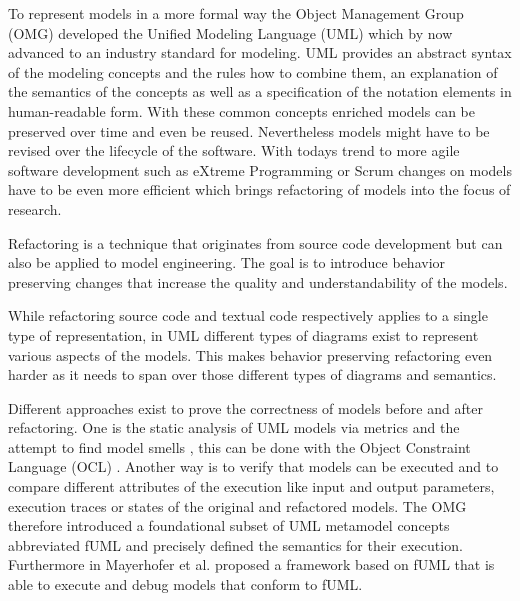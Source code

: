 \documentclass{llncs}
\begin{document}

To represent models in a more formal way the Object Management Group (OMG) developed the Unified Modeling Language (UML) 
\cite{man:UML} which by now advanced to an industry standard for 
modeling. UML provides an abstract syntax of the modeling concepts and the rules how to combine them, an explanation 
of the semantics of the concepts as well as a specification of the notation elements in human-readable form.
With these common concepts enriched models can be preserved over time and even be reused. Nevertheless models 
might have to be revised over the lifecycle of the software. With todays trend to more agile software 
development such as eXtreme Programming \cite{DBLP:journals/computer/Beck99} or Scrum \cite{DBLP:journals/software/RisingJ00} 
changes on models have to be even more efficient which brings refactoring of models into the focus of research.


Refactoring is a technique that originates from source code development but can also be applied to model engineering.
The goal is to introduce behavior preserving changes \cite{mast:REFOOF} that increase the quality and understandability
of the models.


While refactoring source code and textual code respectively applies to a single type of representation, in UML different
types of diagrams exist to represent various aspects of the models. This makes behavior preserving refactoring even harder 
as it needs to span over those different types of diagrams and semantics.


Different approaches exist to prove the correctness of models before and after refactoring. One is the static analysis of
UML models via metrics and the attempt to find model smells \cite{DBLP:conf/models/ArendtTW13}, this can be done with
the Object Constraint Language (OCL) \cite{man:OCL}. Another way is to verify that models can be executed and to compare 
different attributes of the execution like input and output parameters, execution traces or states of the 
original and refactored models. The OMG therefore introduced a foundational subset 
of UML metamodel concepts abbreviated fUML \cite{man:FUML} and precisely defined the semantics for their execution.
Furthermore in \cite{DBLP:conf/icse/Mayerhofer12} Mayerhofer et al. proposed a framework based on fUML that is able to execute
and debug models that conform to fUML.
\end{document}
